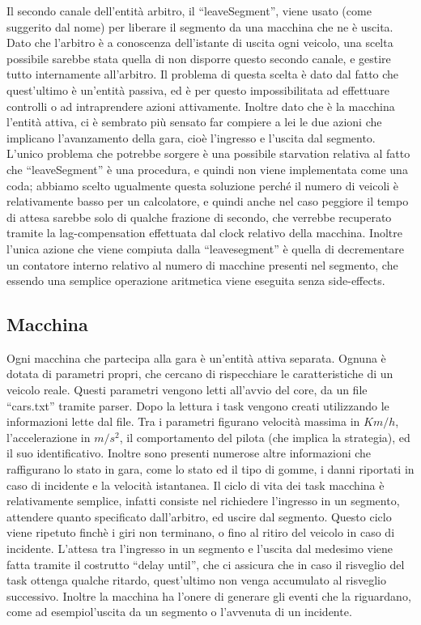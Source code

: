 Il secondo canale dell’entità arbitro, il “leaveSegment”, viene usato (come suggerito dal nome) per liberare il segmento da una macchina che ne è uscita. Dato che l’arbitro è a conoscenza dell’istante di uscita ogni veicolo, una scelta possibile sarebbe stata quella di non disporre questo secondo canale, e gestire tutto internamente all’arbitro. Il problema di questa scelta è dato dal fatto che quest’ultimo è un’entità passiva, ed è per questo impossibilitata ad effettuare controlli o ad intraprendere azioni attivamente. Inoltre dato che è la macchina l’entità attiva, ci è sembrato più sensato far compiere a lei le due azioni che implicano l’avanzamento della gara, cioè l’ingresso e l’uscita dal segmento. L’unico problema che potrebbe sorgere è una possibile starvation relativa al fatto che “leaveSegment” è una procedura, e quindi non viene implementata come una coda; abbiamo scelto ugualmente questa soluzione perché il numero di veicoli è relativamente basso per un calcolatore, e quindi anche nel caso peggiore il tempo di attesa sarebbe solo di qualche frazione di secondo, che verrebbe recuperato tramite la lag-compensation effettuata dal clock relativo della macchina. Inoltre l’unica azione che viene compiuta dalla “leavesegment” è quella di decrementare un contatore interno relativo al numero di macchine presenti nel segmento, che essendo una semplice operazione aritmetica viene eseguita senza side-effects.

\subsection{Macchina}

Ogni macchina che partecipa alla gara è un’entità attiva separata. Ognuna è dotata di parametri propri, che cercano di rispecchiare le caratteristiche di un veicolo reale. Questi parametri vengono letti all’avvio del core, da un file “cars.txt” tramite parser. Dopo la lettura i task vengono creati utilizzando le informazioni lette dal file. Tra i parametri figurano velocità massima in $Km/h$, l’accelerazione in $m/s^2$, il comportamento del pilota (che implica la strategia), ed il suo identificativo. Inoltre sono presenti numerose altre informazioni che raffigurano lo stato in gara, come lo stato ed il tipo di gomme, i danni riportati in caso di incidente e la velocità istantanea.
Il ciclo di vita dei task macchina è relativamente semplice, infatti consiste nel richiedere l’ingresso in un segmento, attendere quanto specificato dall’arbitro, ed uscire dal segmento.
Questo ciclo viene ripetuto finchè i giri non terminano, o fino al ritiro del veicolo in caso di incidente.
L’attesa tra l’ingresso in un segmento e l’uscita dal medesimo viene fatta tramite il costrutto “delay until”, che ci assicura che in caso il risveglio del task ottenga qualche ritardo, quest’ultimo non venga accumulato al risveglio successivo.
Inoltre la macchina ha l’onere di generare gli eventi che la riguardano, come ad esempiol’uscita da un segmento o l’avvenuta di un incidente.

